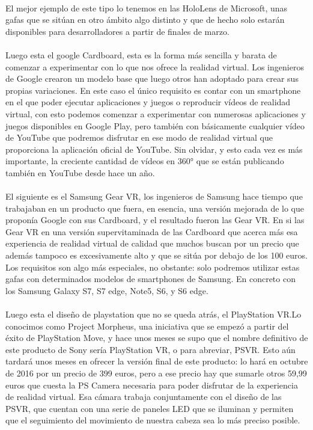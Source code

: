 \documentclass{bmcart}
\begin{document}
\paragraph{}
El mejor ejemplo de este tipo lo tenemos en las HoloLens de Microsoft, unas gafas que se sitúan en otro ámbito algo distinto y que de hecho solo estarán disponibles para desarrolladores a partir de finales de marzo.
\paragraph{}
Luego esta el google Cardboard, esta es la forma más sencilla y barata de comenzar a experimentar con lo que nos ofrece la realidad virtual. Los ingenieros de Google crearon un modelo base que luego otros han adoptado para crear sus propias variaciones. En este caso el único requisito es contar con un smartphone en el que poder ejecutar aplicaciones y juegos o reproducir vídeos de realidad virtual, con esto podemos comenzar a experimentar con numerosas aplicaciones y juegos disponibles en Google Play, pero también con básicamente cualquier vídeo de YouTube que podremos disfrutar en ese modo de realidad virtual que proporciona la aplicación oficial de YouTube. Sin olvidar, y esto cada vez es más importante, la creciente cantidad de vídeos en 360° que se están publicando también en YouTube desde hace un año.
\paragraph{}
El siguiente es el Samsung Gear VR, los ingenieros de Samsung hace tiempo que trabajaban en un producto que fuera, en esencia, una versión mejorada de lo que proponía Google con sus Cardboard, y el resultado fueron las Gear VR. En si las Gear VR en una versión supervitaminada de las Cardboard que acerca más esa experiencia de realidad virtual de calidad que muchos buscan por un precio que además tampoco es excesivamente alto y que se sitúa por debajo de los 100 euros. Los requisitos son algo más especiales, no obstante: solo podremos utilizar estas gafas con determinados modelos de smartphones de Samsung. En concreto con los Samsung Galaxy S7, S7 edge, Note5, S6, y S6 edge.
\paragraph{}
Luego esta el diseño de playstation que no se queda atrás, el PlayStation VR.Lo conocimos como Project Morpheus, una iniciativa que se empezó a partir del éxito de PlayStation Move, y hace unos meses se supo que el nombre definitivo de este producto de Sony sería PlayStation VR, o para abreviar, PSVR. Esto aún tardará unos meses en ofrecer la versión final de este producto: lo hará en octubre de 2016 por un precio de 399 euros, pero a ese precio hay que sumarle otros 59,99 euros que cuesta la PS Camera necesaria para poder disfrutar de la experiencia de realidad virtual. Esa cámara trabaja conjuntamente con el diseño de las PSVR, que cuentan con una serie de paneles LED que se iluminan y permiten que el seguimiento del movimiento de nuestra cabeza sea lo más preciso posible.
\end{document}
